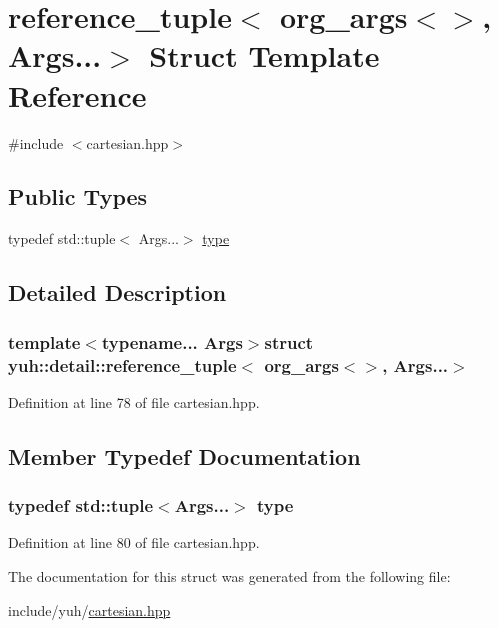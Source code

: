 \hypertarget{structyuh_1_1detail_1_1reference__tuple_3_01org__args_3_4_00_01Args_8_8_8_4}{\section{reference\-\_\-tuple$<$ org\-\_\-args$<$$>$, \-Args...$>$ \-Struct \-Template \-Reference}
\label{d4/d5c/structyuh_1_1detail_1_1reference__tuple_3_01org__args_3_4_00_01Args_8_8_8_4}
}


{\ttfamily \#include $<$cartesian.\-hpp$>$}

\subsection*{\-Public \-Types}
\begin{DoxyCompactItemize}
\item 
typedef std\-::tuple$<$ \-Args...$>$ \hyperlink{structyuh_1_1detail_1_1reference__tuple_3_01org__args_3_4_00_01Args_8_8_8_4_a0c208c6f55e889b43018b13a7aa6a8da}{type}
\end{DoxyCompactItemize}


\subsection{\-Detailed \-Description}
\subsubsection*{template$<$typename... \-Args$>$struct yuh\-::detail\-::reference\-\_\-tuple$<$ org\-\_\-args$<$$>$, Args...$>$}



\-Definition at line 78 of file cartesian.\-hpp.



\subsection{\-Member \-Typedef \-Documentation}
\hypertarget{structyuh_1_1detail_1_1reference__tuple_3_01org__args_3_4_00_01Args_8_8_8_4_a0c208c6f55e889b43018b13a7aa6a8da}{
\subsubsection[{type}]{\setlength{\rightskip}{0pt plus 5cm}typedef std\-::tuple$<$\-Args...$>$ {\bf type}}}\label{d4/d5c/structyuh_1_1detail_1_1reference__tuple_3_01org__args_3_4_00_01Args_8_8_8_4_a0c208c6f55e889b43018b13a7aa6a8da}


\-Definition at line 80 of file cartesian.\-hpp.



\-The documentation for this struct was generated from the following file\-:\begin{DoxyCompactItemize}
\item 
include/yuh/\hyperlink{cartesian_8hpp}{cartesian.\-hpp}\end{DoxyCompactItemize}
